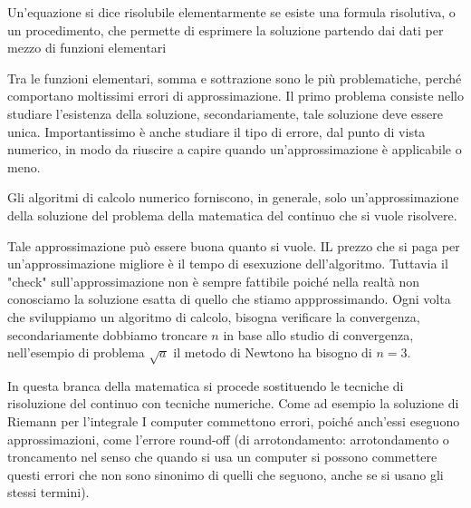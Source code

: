 \newpage
\begin{notion}
    Un'equazione si dice risolubile elementarmente se esiste una formula risolutiva, o un procedimento, che permette
    di esprimere la soluzione partendo dai dati per mezzo di funzioni elementari 
\end{notion}
Tra le funzioni elementari, somma e sottrazione sono le più problematiche, perché comportano moltissimi errori di 
approssimazione.
\newline
Il primo problema consiste nello studiare l'esistenza della soluzione, secondariamente, tale soluzione deve essere unica.
Importantissimo è anche studiare il tipo di errore, dal punto di vista numerico, in modo da riuscire a capire quando 
un'approssimazione è applicabile o meno.
\begin{definition}
    Gli algoritmi di calcolo numerico forniscono, in generale, solo un'approssimazione della soluzione del problema della matematica del 
    continuo che si vuole risolvere. 
\end{definition}
Tale approssimazione può essere buona quanto si vuole. IL prezzo che si paga per un'approssimazione migliore è il tempo di esexuzione 
dell'algoritmo.
Tuttavia il "check" sull'approssimazione non è sempre fattibile poiché nella realtà non conosciamo la soluzione esatta di quello che stiamo 
appprossimando.
\newline
{}
Ogni volta che sviluppiamo un algoritmo di calcolo, bisogna verificare la convergenza, secondariamente dobbiamo troncare $n$ in base allo 
studio di convergenza, nell'esempio di problema $\sqrt{a}$ il metodo di Newtono ha bisogno di $n=3$.

\newpage
In questa branca della matematica si procede sostituendo le tecniche di risoluzione del continuo con tecniche numeriche.
Come ad esempio la soluzione di Riemann per l'integrale 
I computer commettono errori, poiché anch'essi eseguono approssimazioni, come l'errore round-off (di arrotondamento: arrotondamento o 
troncamento nel senso che quando si usa un computer si possono commettere questi errori che non sono sinonimo di quelli che seguono, 
anche se si usano gli stessi termini).

